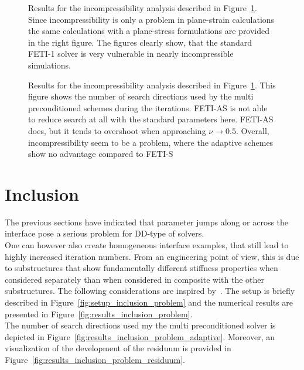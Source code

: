 \begin{figure}[tb]
  \begin{center}
    
    \caption[Study of incompressibility handling: \# iterations]{Results for the incompressibility analysis described in Figure~\ref{fig:results_problem_incompressibility}. Since incompressibility is only a problem in plane-strain calculations the same calculations with a plane-stress formulations are provided in the right figure. The figures clearly show, that the standard FETI-1 solver is very vulnerable in nearly incompressible simulations.}
    \label{fig:results_problem_incompressibility}
  \end{center}
\end{figure}

\begin{figure}%
  \begin{center}
    
    \caption[Study of incompressibility handling: \# search directions]{Results for the incompressibility analysis described in Figure~\ref{fig:results_problem_incompressibility}. This figure shows the number of search directions used by the multi preconditioned schemes during the iterations. FETI-AS is not able to reduce search at all with the standard parameters here. FETI-AS does, but it tends to overshoot when approaching $\nu\rightarrow 0.5$. Overall, incompressibility seem to be a problem, where the adaptive schemes show no advantage compared to FETI-S}
    \label{fig:todo}
  \end{center}
\end{figure}

\FloatBarrier
\section{Inclusion}
The previous sections have indicated that parameter jumps along or across the interface pose a serious problem for DD-type of solvers.\\
One can however also create homogeneous interface examples, that still lead to highly increased iteration numbers. From an engineering point of view, this is due to substructures that show fundamentally different stiffness properties when considered separately than when considered in composite with the other substructures. The following considerations are inspired by~\cite{Gosselet2015}. The setup is briefly described in Figure~\ref{fig:setup_inclusion_problem} and the numerical results are presented in Figure~\ref{fig:results_inclusion_problem}.\\
The number of search directions used my the multi preconditioned solver is depicted in Figure~\ref{fig:results_inclusion_problem_adaptive}. Moreover, an visualization of the development of the residuum is provided in Figure~\ref{fig:results_inclusion_problem_residuum}.

